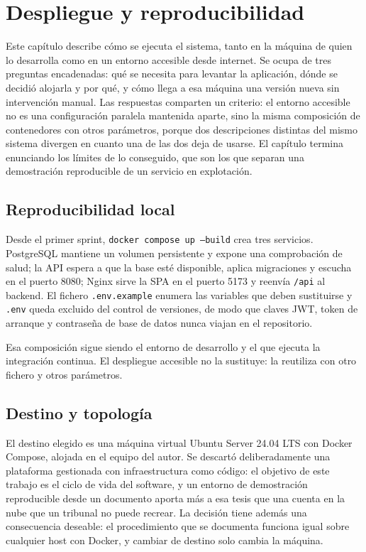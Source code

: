 \chapter{Despliegue y reproducibilidad}
\label{chap:despliegue}

Este capítulo describe cómo se ejecuta el sistema, tanto en la máquina de quien lo desarrolla como en un entorno accesible desde internet. Se ocupa de tres preguntas encadenadas: qué se necesita para levantar la aplicación, dónde se decidió alojarla y por qué, y cómo llega a esa máquina una versión nueva sin intervención manual. Las respuestas comparten un criterio: el entorno accesible no es una configuración paralela mantenida aparte, sino la misma composición de contenedores con otros parámetros, porque dos descripciones distintas del mismo sistema divergen en cuanto una de las dos deja de usarse. El capítulo termina enunciando los límites de lo conseguido, que son los que separan una demostración reproducible de un servicio en explotación.

\section{Reproducibilidad local}

Desde el primer sprint, \texttt{docker compose up --build} crea tres servicios. PostgreSQL mantiene un volumen persistente y expone una comprobación de salud; la API espera a que la base esté disponible, aplica migraciones y escucha en el puerto 8080; Nginx sirve la SPA en el puerto 5173 y reenvía \texttt{/api} al backend. El fichero \texttt{.env.example} enumera las variables que deben sustituirse y \texttt{.env} queda excluido del control de versiones, de modo que claves JWT, token de arranque y contraseña de base de datos nunca viajan en el repositorio.

Esa composición sigue siendo el entorno de desarrollo y el que ejecuta la integración continua. El despliegue accesible no la sustituye: la reutiliza con otro fichero y otros parámetros.

\section{Destino y topología}

El destino elegido es una máquina virtual Ubuntu Server 24.04 LTS con Docker Compose, alojada en el equipo del autor. Se descartó deliberadamente una plataforma gestionada con infraestructura como código: el objetivo de este trabajo es el ciclo de vida del software, y un entorno de demostración reproducible desde un documento aporta más a esa tesis que una cuenta en la nube que un tribunal no puede recrear. La decisión tiene además una consecuencia deseable: el procedimiento que se documenta funciona igual sobre cualquier host con Docker, y cambiar de destino solo cambia la máquina.

